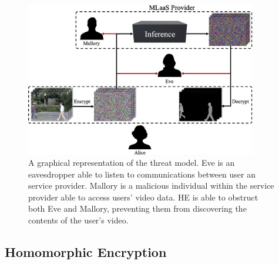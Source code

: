 \begin{figure}[ht]
    \centering
    \includegraphics[width=0.9\textwidth]{figures/threatModel}
    \caption[The Threat Model]{A graphical representation of the threat model. Eve is an eavesdropper able to listen to communications between user an service provider. Mallory is a malicious individual within the service provider able to access users' video data. HE is able to obstruct both Eve and Mallory, preventing them from discovering the contents of the user's video.}
    \label{fig:threatModel}
\end{figure}

\setlength{\leftskip}{0cm}

\subsection{Homomorphic Encryption}
\label{sec:homomorphicEncryption}
